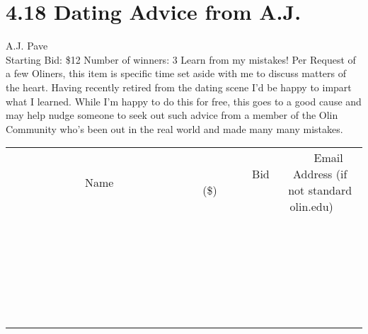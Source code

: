 \documentclass[11pt]{article}
\begin{document}
\section*{4.18 Dating Advice from A.J.}
A.J. Pave
\\
Starting Bid: \$12
\newline
Number of winners: 3
\newline
Learn from my mistakes! Per Request of a few Oliners, this item is specific time set aside with me to discuss matters of the heart. Having recently retired from the dating scene I'd be happy to impart what I learned. While I'm happy to do this for free, this goes to a good cause and may help nudge someone to seek out such advice from a member of the Olin Community who's been out in the real world and made many many mistakes.
\\[6ex]
\begin{tabular}{c c c}
~~~~~~~~~~~~~Name~~~~~~~~~~~~~ & ~~~~~~~~~Bid (\$)~~~~~~~~~  & ~~~Email Address (if not standard olin.edu)~~~\\
 & & \\
\hline
 & & \\
\hline
 & & \\
\hline
 & & \\
\hline
 & & \\
\hline
 & & \\
\hline
 & & \\
\hline
 & & \\
\hline
 & & \\
\hline
 & & \\
\hline
 & & \\
\hline
 & & \\
\hline
 & & \\
\hline
 & & \\
\hline
 & & \\
\hline
 & & \\
\hline
 & & \\
\hline
 & & \\
\hline
 & & \\
\hline
 & & \\
\hline
 & & \\
\hline
 & & \\
\hline
 & & \\
\hline
 & & \\
\hline
 & & \\
\hline
 & & \\
\hline
\end{tabular}
\newpage
\end{document}
